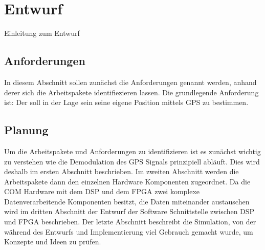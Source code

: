 \chapter{Entwurf}
Einleitung zum Entwurf

\section{Anforderungen}
In diesem Abschnitt sollen zunächst die Anforderungen genannt werden, anhand derer sich die Arbeitspakete identifiezieren lassen. Die grundlegende Anforderung ist: Der \dscubesat soll in der Lage sein seine eigene Position mittels GPS zu bestimmen. 

\section{Planung}
Um die Arbeitspakete und Anforderungen zu identifizieren ist es zunächst wichtig zu verstehen wie die Demodulation des GPS Signals prinzipiell abläuft. Dies wird deshalb im ersten Abschnitt beschrieben. Im zweiten Abschnitt werden die Arbeitspakete dann den einzelnen Hardware Komponenten zugeordnet. Da die COM Hardware mit dem DSP und dem FPGA zwei komplexe Datenverarbeitende Komponenten besitzt, die Daten miteinander austauschen wird im dritten Abschnitt der Entwurf der Software Schnittstelle zwischen DSP und FPGA beschrieben. Der letzte Abschnitt beschreibt die Simulation, von der während des Entwurfs und Implementierung viel Gebrauch gemacht wurde, um Konzepte und Ideen zu prüfen.



